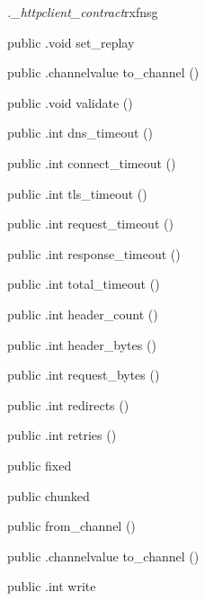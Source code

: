 \begin{CrexxClass}{\textit{.\_httpclient\_contract}}{rxfnsg}
\begin{Members}
    \Method
      {public}
      {.void}
      {set\_replay}
      {}

    \Method
      {public}
      {.channelvalue}
      {to\_channel}
      {()}

    \Method
      {public}
      {.void}
      {validate}
      {()}

    \Method
      {public}
      {.int}
      {dns\_timeout}
      {()}

    \Method
      {public}
      {.int}
      {connect\_timeout}
      {()}

    \Method
      {public}
      {.int}
      {tls\_timeout}
      {()}

    \Method
      {public}
      {.int}
      {request\_timeout}
      {()}

    \Method
      {public}
      {.int}
      {response\_timeout}
      {()}

    \Method
      {public}
      {.int}
      {total\_timeout}
      {()}

    \Method
      {public}
      {.int}
      {header\_count}
      {()}

    \Method
      {public}
      {.int}
      {header\_bytes}
      {()}

    \Method
      {public}
      {.int}
      {request\_bytes}
      {()}

    \Method
      {public}
      {.int}
      {redirects}
      {()}

    \Method
      {public}
      {.int}
      {retries}
      {()}

    \Factory
      {public}
      {fixed}
      {}

    \Factory
      {public}
      {chunked}
      {}

    \Factory
      {public}
      {from\_channel}
      {()}

    \Method
      {public}
      {.channelvalue}
      {to\_channel}
      {()}

    \Method
      {public}
      {.int}
      {write}
      {}


\end{Members}
\end{CrexxClass}
